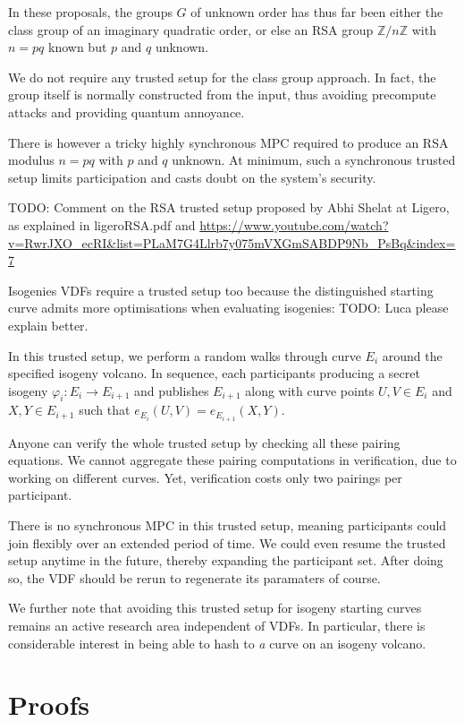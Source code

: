 \documentclass{article}
\newcommand{\Z}{\mathbb{Z}}
\begin{document}
In these proposals, the groups $G$ of unknown order has thus far been
either the class group of an imaginary quadratic order, or else an
RSA group $\Z/n\Z$ with $n = p q$ known but $p$ and $q$ unknown.

We do not require any trusted setup for the class group approach.
In fact, the group itself is normally constructed from the input,
thus avoiding precompute attacks and providing quantum annoyance.  

There is however a tricky highly synchronous MPC required to produce
an RSA modulus $n = p q$ with $p$ and $q$ unknown.  At minimum, such
a synchronous trusted setup limits participation and casts doubt on
the system's security.  

TODO: Comment on the RSA trusted setup proposed by Abhi Shelat at Ligero, as explained in ligeroRSA.pdf and  \url{https://www.youtube.com/watch?v=RwrJXO_ecRI&list=PLaM7G4Llrb7y075mVXGmSABDP9Nb_PsBq&index=7}

Isogenies VDFs require a trusted setup too because the distinguished
starting curve admits more optimisations when evaluating isogenies:
TODO: Luca please explain better.

In this trusted setup, we perform a random walks through curve $E_i$
around the specified isogeny volcano.  In sequence, each participants
producing a secret isogeny $φ_i : E_i \to E_{i+1}$ and publishes
$E_{i+1}$ along with curve points $U,V \in E_i$ and $X,Y \in E_{i+1}$
such that $e_{E_i}(U,V) = e_{E_{i+1}}(X,Y)$.  

Anyone can verify the whole trusted setup by checking all these
pairing equations.  We cannot aggregate these pairing computations
in verification, due to working on different curves.  Yet, verification
costs only two pairings per participant.

There is no synchronous MPC in this trusted setup, meaning participants
could join flexibly over an extended period of time.  We could even
resume the trusted setup anytime in the future, thereby expanding the
participant set.  After doing so, the VDF should be rerun to
regenerate its paramaters of course.

We further note that avoiding this trusted setup for isogeny starting
curves remains an active research area independent of VDFs. 
In particular, there is considerable interest in being able to hash to
{\it a} curve on an isogeny volcano.


\section{Proofs}
\end{document}
